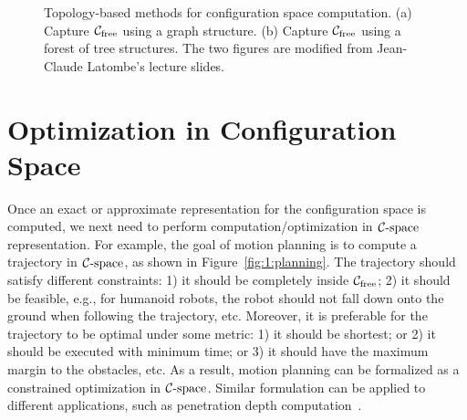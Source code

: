 \begin{figure}[htb]
  \centering
  \caption[Topology-based methods for configuration space computation]{Topology-based methods for configuration space computation. (a) Capture $\mathcal C_{\text{free}}$ using a graph structure. (b) Capture $\mathcal C_{\text{free}}$ using a forest of tree structures. The two figures are modified from Jean-Claude Latombe's lecture slides.}\label{fig:1:topologycspace}
\end{figure}




\section{Optimization in Configuration Space}
\label{sec:1:optimization}
Once an exact or approximate representation for the configuration space is computed, we next need to perform computation/optimization in $\mathcal C\text{-space}$ representation. For example, the goal of motion planning is to compute a trajectory in $\mathcal C\text{-space}$, as shown in Figure~\ref{fig:1:planning}. The trajectory should satisfy different constraints: 1) it should be completely inside $\mathcal C_{\text{free}}$; 2) it should be feasible, e.g., for humanoid robots, the robot should not fall down onto the ground when following the trajectory, etc. Moreover, 
it is preferable for the trajectory to be optimal under some metric: 1) it should be shortest; or 2) it should be executed with minimum time; or 3) it should have the maximum margin to the obstacles, etc. As a result, motion planning can be formalized as a constrained optimization in $\mathcal C\text{-space}$. Similar formulation can be applied to different applications, such as penetration depth computation~\cite{Zhang:2007:GPD,Zhang:2007:AFP,Zhang:2008:ICRA,Je:2012:PRP}.


